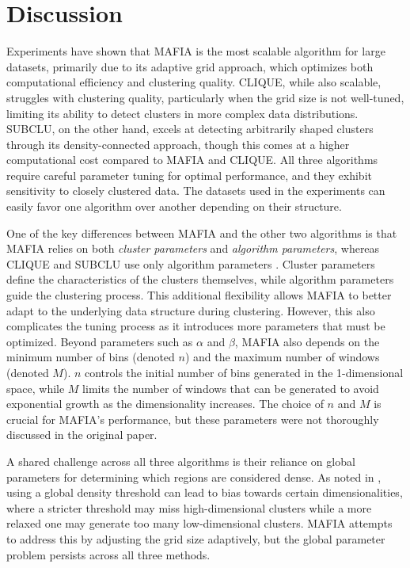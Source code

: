 \section{Discussion}
Experiments have shown that MAFIA is the most scalable algorithm for large datasets, primarily due to its adaptive grid approach, which optimizes both computational efficiency and clustering quality. CLIQUE, while also scalable, struggles with clustering quality, particularly when the grid size is not well-tuned, limiting its ability to detect clusters in more complex data distributions. SUBCLU, on the other hand, excels at detecting arbitrarily shaped clusters through its density-connected approach, though this comes at a higher computational cost compared to MAFIA and CLIQUE. All three algorithms require careful parameter tuning for optimal performance, and they exhibit sensitivity to closely clustered data. The datasets used in the experiments can easily favor one algorithm over another depending on their structure.

One of the key differences between MAFIA and the other two algorithms is that MAFIA relies on both \textit{cluster parameters} and \textit{algorithm parameters}, whereas CLIQUE and SUBCLU use only algorithm parameters \cite[p.~342]{sim-2012}. Cluster parameters define the characteristics of the clusters themselves, while algorithm parameters guide the clustering process. This additional flexibility allows MAFIA to better adapt to the underlying data structure during clustering. However, this also complicates the tuning process as it introduces more parameters that must be optimized. Beyond parameters such as $\alpha$ and $\beta$, MAFIA also depends on the minimum number of bins (denoted $n$) and the maximum number of windows (denoted $M$). $n$ controls the initial number of bins generated in the 1-dimensional space, while $M$ limits the number of windows that can be generated to avoid exponential growth as the dimensionality increases. The choice of $n$ and $M$ is crucial for MAFIA's performance, but these parameters were not thoroughly discussed in the original paper.

A shared challenge across all three algorithms is their reliance on global parameters for determining which regions are considered dense. As noted in \cite[p.1:16]{kriegel-2009}, using a global density threshold can lead to bias towards certain dimensionalities, where a stricter threshold may miss high-dimensional clusters while a more relaxed one may generate too many low-dimensional clusters. MAFIA attempts to address this by adjusting the grid size adaptively, but the global parameter problem persists across all three methods.

